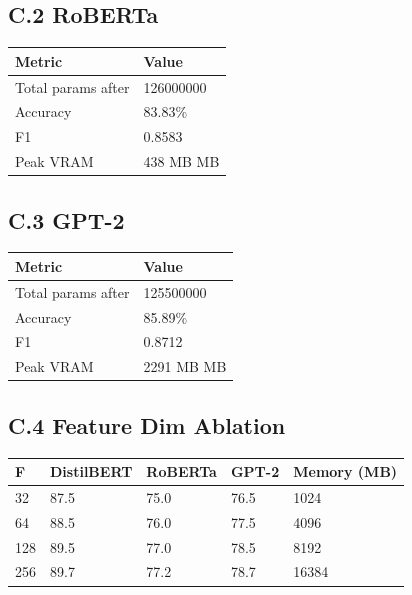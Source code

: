 \subsection{C.2 RoBERTa}

\begin{table}[H]
\centering
\small
\begin{tabular}{ll}
\toprule
\textbf{Metric} & \textbf{Value} \\
\midrule
Total params after & 126000000 \\
Accuracy & 83.83\% \\
F1 & 0.8583 \\
Peak VRAM & 438 MB MB \\
\bottomrule
\end{tabular}
\end{table}

\subsection{C.3 GPT-2}

\begin{table}[H]
\centering
\small
\begin{tabular}{ll}
\toprule
\textbf{Metric} & \textbf{Value} \\
\midrule
Total params after & 125500000 \\
Accuracy & 85.89\% \\
F1 & 0.8712 \\
Peak VRAM & 2291 MB MB \\
\bottomrule
\end{tabular}
\end{table}

\subsection{C.4 Feature Dim Ablation}

\begin{table}[H]
\centering
\small
\begin{tabular}{lllll}
\toprule
\textbf{F} & \textbf{DistilBERT} & \textbf{RoBERTa} & \textbf{GPT-2} & \textbf{Memory (MB)} \\
\midrule
32 & 87.5 & 75.0 & 76.5 & 1024 \\
64 & 88.5 & 76.0 & 77.5 & 4096 \\
128 & 89.5 & 77.0 & 78.5 & 8192 \\
256 & 89.7 & 77.2 & 78.7 & 16384 \\
\bottomrule
\end{tabular}
\end{table}

